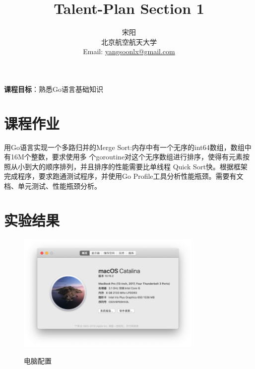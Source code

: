 \documentclass[UTF8]{ctexart}
\title{\huge{\heiti Talent-Plan Section 1}}
\author{\small{\kaishu 宋阳}\\[2pt]
\small{\kaishu 北京航空航天大学}\\[2pt]
\small{Email:}
\url{yangsoonlx@gmail.com}
}
\date{} %
\begin{document}
\maketitle

\begin{flushleft}
\textbf{课程目标}：熟悉Go语言基础知识 \\[8pt]
\end{flushleft}
\section{课程作业}\label{sec1}
用Go语言实现一个多路归并的Merge Sort:内存中有一个无序的int64数组，数组中有16M个整数，要求使用多
个goroutine对这个无序数组进行排序，使得有元素按照从小到大的顺序排列，并且排序的性能需要比单线程
Quick Sort快。根据框架完成程序，要求跑通测试程序，并使用Go
Profile工具分析性能瓶颈。需要有文档、单元测试、性能瓶颈分析。\\

\section{实验结果}\label{sec2}
\begin{figure}[H]
  \centering
  \includegraphics[width=0.8\textwidth]{fig/电脑配置.png}\\
  \caption{电脑配置}
  \label{mre1}
\end{figure}
\end{document}
